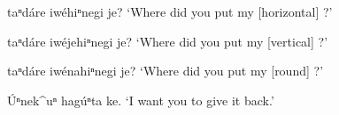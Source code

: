 \documentclass[output=paper]{LSP/langsci}
\begin{document}
\begin{list}{}{}
\item{\underline{\hspace{1em}} taⁿdáre iwéhiⁿnegi  je? `Where did you put my [horizontal] \underline{\hspace{1em}}?'}
\item{\underline{\hspace{1em}} taⁿdáre iwéjehiⁿnegi je? `Where did you put my [vertical] \underline{\hspace{1em}}?'}
\item{\underline{\hspace{1em}} taⁿdáre iwénahiⁿnegi je? `Where did you put my [round] \underline{\hspace{1em}}?'}
\item{\'Uⁿnek\^{ }uⁿ hagúⁿta ke. `I want you to give it back.'}
\end{list} 
\end{document}
